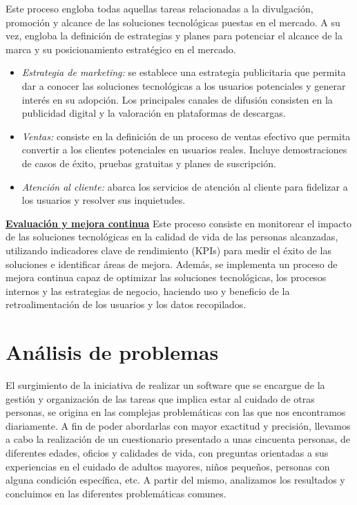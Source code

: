 \documentclass[a4paper,12pt]{article}
\begin{document}
    \newline
    Este proceso engloba todas aquellas tareas relacionadas a la divulgación, promoción y alcance de las soluciones tecnológicas puestas en el mercado. A su vez, engloba la definición de estrategias y planes para potenciar el alcance de la marca y su posicionamiento estratégico en el mercado.
    \begin{itemize}
        \item[] \textit{Estrategia de marketing:} se establece una estrategia publicitaria que permita dar a conocer las soluciones tecnológicas a los usuarios potenciales y generar interés en su adopción. Los principales canales de difusión consisten en la publicidad digital y la valoración en plataformas de descargas.
        \item[] \textit{Ventas:} consiste en la definición de un proceso de ventas efectivo que permita convertir a los clientes potenciales en usuarios reales. Incluye demostraciones de casos de éxito, pruebas gratuitas y planes de suscripción.
        \item[] \textit{Atención al cliente:} abarca los servicios de atención al cliente para fidelizar a los usuarios y resolver sus inquietudes.
    \end{itemize}
    \textbf{\underline{Evaluación y mejora continua}}
    \newline
    Este proceso consiste en monitorear el impacto de las soluciones tecnológicas en la calidad de vida de las personas alcanzadas, utilizando indicadores clave de rendimiento (KPIs) para medir el éxito de las soluciones e identificar áreas de mejora.\newline
    Además, se implementa un proceso de mejora continua capaz de optimizar las soluciones tecnológicas, los procesos internos y las estrategias de negocio, haciendo uso y beneficio de la retroalimentación de los usuarios y los datos recopilados.

    \newpage

    \section{Análisis de problemas}
    El surgimiento de la iniciativa de realizar un software que se encargue de la gestión y organización de las tareas que implica estar al cuidado de otras personas, se origina en las complejas problemáticas con las que nos encontramos diariamente.\newline
    A fin de poder abordarlas con mayor exactitud y precisión, llevamos a cabo la realización de un cuestionario presentado a unas cincuenta personas, de diferentes edades, oficios y calidades de vida, con preguntas orientadas a sus experiencias en el cuidado de adultos mayores, niños pequeños, personas con alguna condición específica, etc. A partir del mismo, analizamos los resultados y concluimos en las diferentes problemáticas comunes.\newline
    \newline
\end{document}
